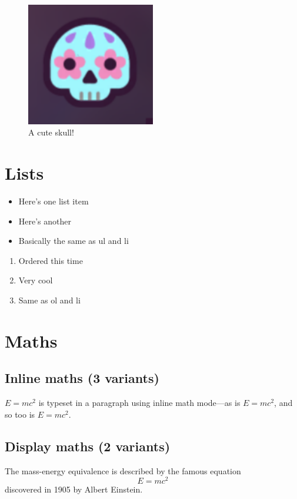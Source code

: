 \documentclass[12pt]{article}
\begin{document}
\begin{figure}
    \centering
    \includegraphics[width=0.5\textwidth]{skull}
    \caption{A cute skull!}
    \label{fig:skull2}
\end{figure}

\section{Lists}

\begin{itemize}
    \item Here's one list item 
    \item Here's another
    \item Basically the same as ul and li
\end{itemize}

\begin{enumerate}
    \item Ordered this time 
    \item Very cool
    \item Same as ol and li
\end{enumerate}

\section{Maths} 
\subsection{Inline maths (3 variants)}
\begin{math}E=mc^2\end{math} is typeset in a paragraph using inline math mode---as is $E=mc^2$, and so too is \(E=mc^2\).

\subsection{Display maths (2 variants)}
The mass-energy equivalence is described by the famous equation \[ E=mc^2 \] discovered in 1905 by Albert Einstein. 
\end{document}
